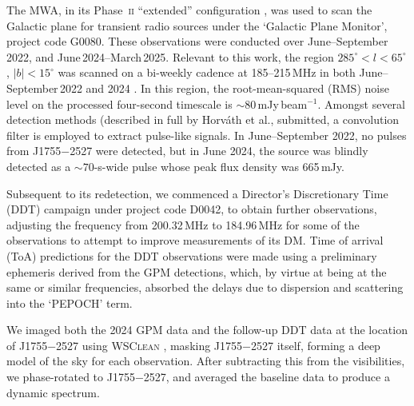 \documentclass[fleqn,usenatbib]{mnras}
\newcommand{\revision}[2]{{\color{red}#2}}
\newcommand{\src}{J1755$-$2527}
\begin{document}
\revision{\src{} was detected blindly with the Murchison Widefield Array \citep[MWA;][]{Tingay2013} in observations taken between June--September 2024 under the `Galactic Plane Monitor', project code G0080. The prime objective of the campaign was to search for long-period transients by scanning the Galactic plane over $285^\circ < l < 65^\circ$, $|b| < 15^\circ$ on a bi-weekly cadence at 185--215\,MHz \citep[see Methods of][]{2023Natur.619..487H}; a full description will be released by Hurley-Walker et al., in prep. We also observed over June--September 2022 but made no detections in these data, as reported in \citetalias{2024MNRAS.535..909D}.}{The MWA, in its Phase~\textsc{ii} ``extended'' configuration \citep[][]{2018PASA...35...33W}, was used to scan the Galactic plane for transient radio sources under the `Galactic Plane Monitor', project code G0080. These observations were conducted over June--September\,2022, and June\,2024--March\,2025. Relevant to this work, the region $285^\circ < l < 65^\circ$, $|b| < 15^\circ$ was scanned on a bi-weekly cadence at 185--215\,MHz in both June--September\,2022 and 2024 \citep[see Methods of][a full description will be released by Hurley-Walker et al., in prep]{2023Natur.619..487H}. In this region, the root-mean-squared (RMS) noise level on the processed four-second timescale is $\sim$80\,mJy\,beam$^{-1}$. Amongst several detection methods (described in full by Horv\'ath et al., submitted, a convolution filter is employed to extract pulse-like signals. In June--September 2022, no pulses from \src{} were detected, but in June 2024, the source was blindly detected as a ${\sim}70$-s-wide pulse whose peak flux density was 665\,mJy.}

Subsequent to its redetection, we commenced a Director's Discretionary Time (DDT) campaign under project code D0042, to obtain further observations, adjusting the frequency from 200.32\,MHz to 184.96\,MHz for some of the observations to attempt to improve measurements of its DM.
Time of arrival (ToA) predictions for the DDT observations were made using a preliminary ephemeris derived from the GPM detections, which, by virtue at being at the same or similar frequencies, absorbed the delays due to dispersion and scattering into the `PEPOCH' term.

We imaged both the 2024 GPM data and the follow-up DDT data at the location of \src{} using \textsc{WSClean} \citep{2014MNRAS.444..606O}, masking \src{} itself, forming a deep model of the sky for each observation. After subtracting this from the visibilities, we phase-rotated to \src{}, and averaged the baseline data to produce a dynamic spectrum.
\end{document}
